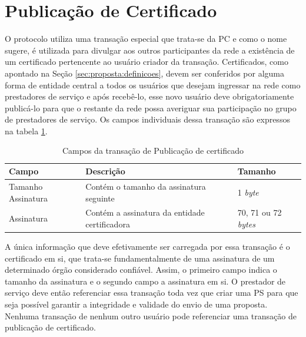 \section{Publicação de Certificado}
\label{sec:proposta:certificado}

O protocolo utiliza uma transação especial que trata-se da \ac{PC} e como o nome sugere, é utilizada para divulgar aos outros participantes da rede a existência de um certificado pertencente ao usuário criador da transação. Certificados, como apontado na Seção \ref{sec:proposta:definicoes}, devem ser conferidos por alguma forma de entidade central a todos os usuários que desejam ingressar na rede como prestadores de serviço e após recebê-lo, esse novo usuário deve obrigatoriamente publicá-lo para que o restante da rede possa averiguar sua participação no grupo de prestadores de serviço. Os campos individuais dessa transação são expressos na tabela \ref{tabela:pc}.

\begin{table}[ht]
\centering
    \begin{tabular}{|m{}|m{}|m{}|}
    \hline
         \textbf{Campo} & \textbf{Descrição} & \textbf{Tamanho}  \\
         \hline
         Tamanho Assinatura & Contém o tamanho da assinatura seguinte & 1 \textit{byte} \\
         \hline
         Assinatura & Contém a assinatura da entidade certificadora & 70, 71 ou 72 \textit{bytes} \\
    \hline
    \end{tabular}
    \caption{Campos da transação de Publicação de certificado}
    \label{tabela:pc}
\end{table}

A única informação que deve efetivamente ser carregada por essa transação é o certificado em si, que trata-se fundamentalmente de uma assinatura de um determinado órgão considerado confiável. Assim, o primeiro campo indica o tamanho da assinatura e o segundo campo a assinatura em si. O prestador de serviço deve então referenciar essa transação toda vez que criar uma \ac{PS} para que seja possível garantir a integridade e validade do envio de uma proposta. Nenhuma transação de nenhum outro usuário pode referenciar uma transação de publicação de certificado. 



